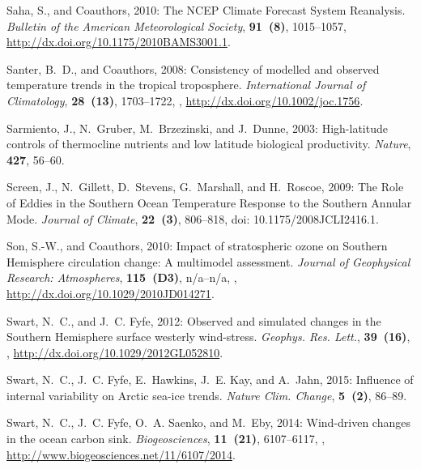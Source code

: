 \documentclass{ametsoc}
\begin{document}
\begin{thebibliography}{53}
Saha, S., and Coauthors, 2010: {The NCEP Climate Forecast System Reanalysis}.
  \textit{Bulletin of the American Meteorological Society}, \textbf{91~(8)},
  1015--1057, \urlprefix\url{http://dx.doi.org/10.1175/2010BAMS3001.1}.

Santer, B.~D., and Coauthors, 2008: {Consistency of modelled and observed
  temperature trends in the tropical troposphere}. \textit{International
  Journal of Climatology}, \textbf{28~(13)}, 1703--1722,
  , \urlprefix\url{http://dx.doi.org/10.1002/joc.1756}.

Sarmiento, J., N.~Gruber, M.~Brzezinski, and J.~Dunne, 2003: {High-latitude
  controls of thermocline nutrients and low latitude biological productivity}.
  \textit{Nature}, \textbf{427}, 56--60.

Screen, J., N.~Gillett, D.~Stevens, G.~Marshall, and H.~Roscoe, 2009: {The Role
  of Eddies in the Southern Ocean Temperature Response to the Southern Annular
  Mode}. \textit{Journal of Climate}, \textbf{22~(3)}, 806--818, doi:
  10.1175/2008JCLI2416.1.

Son, S.-W., and Coauthors, 2010: {Impact of stratospheric ozone on Southern
  Hemisphere circulation change: A multimodel assessment}. \textit{Journal of
  Geophysical Research: Atmospheres}, \textbf{115~(D3)}, n/a--n/a,
  ,
  \urlprefix\url{http://dx.doi.org/10.1029/2010JD014271}.

Swart, N.~C., and J.~C. Fyfe, 2012: {Observed and simulated changes in the
  Southern Hemisphere surface westerly wind-stress}. \textit{Geophys. Res.
  Lett.}, \textbf{39~(16)}, ,
  \urlprefix\url{http://dx.doi.org/10.1029/2012GL052810}.

Swart, N.~C., J.~C. Fyfe, E.~Hawkins, J.~E. Kay, and A.~Jahn, 2015: {Influence
  of internal variability on Arctic sea-ice trends}. \textit{Nature Clim.
  Change}, \textbf{5~(2)}, 86--89.

Swart, N.~C., J.~C. Fyfe, O.~A. Saenko, and M.~Eby, 2014: {Wind-driven changes
  in the ocean carbon sink}. \textit{Biogeosciences}, \textbf{11~(21)},
  6107--6117, ,
  \urlprefix\url{http://www.biogeosciences.net/11/6107/2014}.


\end{thebibliography}
\end{document}
